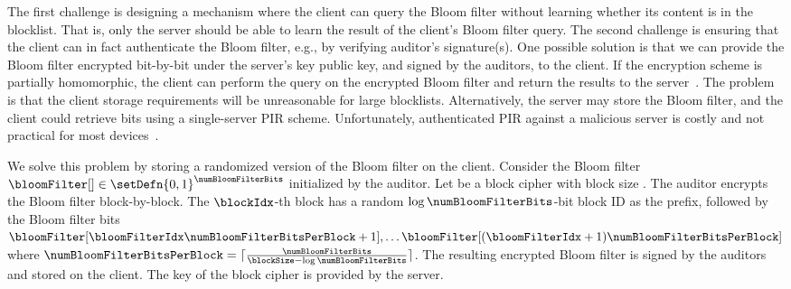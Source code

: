 The first challenge is designing a mechanism where the client can query the Bloom filter without learning whether its content is in the blocklist. That is, only the server should be able to learn the result of the client's Bloom filter query. The second challenge is ensuring that the client can in fact authenticate the Bloom filter, e.g., by verifying auditor's signature(s). One possible solution is that we can provide the Bloom filter encrypted bit-by-bit under the server's key public key, and signed by the auditors, to the client. If the encryption scheme is partially homomorphic, the client can perform the query on the encrypted Bloom filter and return the results to the server~\cite{}. 
The problem is that the client storage requirements will be unreasonable for large blocklists. 
Alternatively, the server may store the Bloom filter, and the client could retrieve bits using a single-server PIR scheme. Unfortunately, authenticated PIR against a malicious server is costly and not practical for most devices~\cite{}. 

We solve this problem by storing a randomized version of the Bloom filter on the client. Consider the Bloom filter 
$\bloomFilter[] \in \setDefn{0,1}^\numBloomFilterBits$ initialized by the auditor. Let \blockCipher be a block cipher with block size \blockSize. The auditor encrypts the Bloom filter block-by-block. The $\blockIdx$-th block has a random $\log \numBloomFilterBits$-bit block ID as the prefix, followed by the Bloom filter bits $\bloomFilter[\bloomFilterIdx \numBloomFilterBitsPerBlock + 1], \dots \bloomFilter[(\bloomFilterIdx + 1)\numBloomFilterBitsPerBlock]$ where $\numBloomFilterBitsPerBlock = \lceil\frac{\numBloomFilterBits}{\blockSize - \log \numBloomFilterBits}\rceil$. The resulting encrypted Bloom filter \clientBloomFilter is signed by the auditors and stored on the client. The key of the block cipher \genericSymmKey is provided by the server. 





